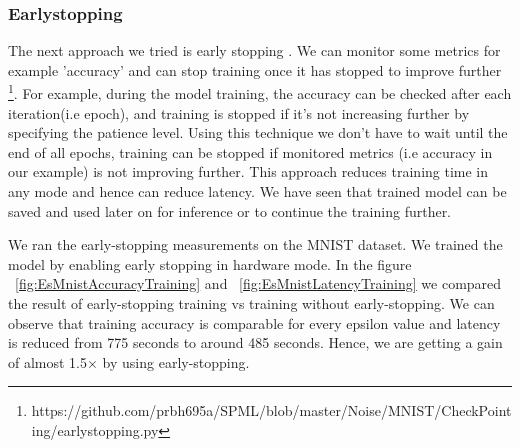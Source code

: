 \subsubsection{Earlystopping}
The next approach we tried is early stopping \cite{85}. We can monitor some metrics for example 'accuracy' and can stop training once it has stopped to improve further \footnote{https://github.com/prbh695a/SPML/blob/master/Noise/MNIST/CheckPointing/earlystopping.py}. For example, during the model training, the accuracy can be checked after each iteration(i.e epoch), and training is stopped if it's not increasing further by specifying the patience level. Using this technique we don't have to wait until the end of all epochs, training can be stopped if monitored metrics (i.e accuracy in our example) is not improving further. This approach reduces training time in any mode and hence can reduce latency. We have seen that trained model can be saved and used later on for inference or to continue the training further. 

We ran the early-stopping measurements on the MNIST dataset. We trained the model by enabling early stopping in hardware mode. In the figure ~\ref{fig:EsMnistAccuracyTraining} and ~\ref{fig:EsMnistLatencyTraining} we compared the result of early-stopping training vs training without early-stopping. We can observe that training accuracy is comparable for every epsilon value and latency is reduced from 775 seconds to around 485 seconds. Hence, we are getting a gain of almost 1.5$\times$ by using early-stopping.

